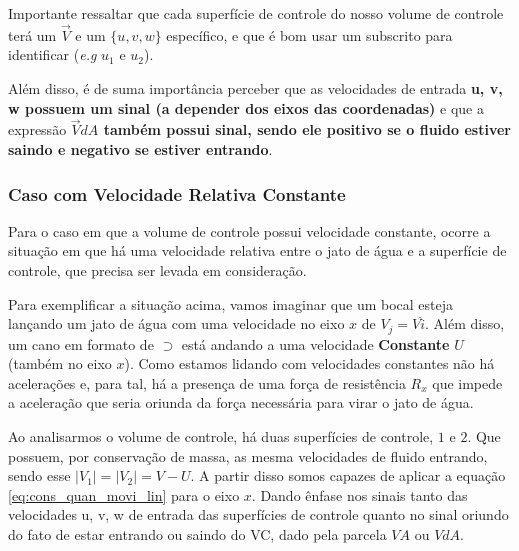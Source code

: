 \documentclass{article}
\begin{document}
            Importante ressaltar que cada superfície de controle do nosso volume de controle terá um $\vec V$ e um $\{u, v, w\}$ específico, e que é bom usar um subscrito para identificar (\emph{e.g} $u_1$ e $u_2$).

            Além disso, é de suma importância perceber que as velocidades de entrada \textbf{{u, v, w} possuem um sinal (a depender dos eixos das coordenadas)} e que a expressão \textbf{$\vec V dA$ também possui sinal, sendo ele positivo se o fluido estiver saindo e negativo se estiver entrando}.

        \subsubsection{Caso com Velocidade Relativa Constante}
            Para o caso em que a volume de controle possui velocidade constante, ocorre a situação em que há uma velocidade relativa entre o jato de água e a superfície de controle, que precisa ser levada em consideração. 
            
            Para exemplificar a situação acima, vamos imaginar que um bocal esteja lançando um jato de água com uma velocidade no eixo $x$ de $V_j = V \hat i$. Além disso, um cano em formato de $\supset$ está andando a uma velocidade \textbf{Constante} $U$ (também no eixo $x$). Como estamos lidando
            com velocidades constantes não há acelerações e, para tal, há a presença de uma força de resistência $R_x$ que impede a aceleração que seria oriunda da força necessária para virar o jato de água.

            Ao analisarmos o volume de controle, há duas superfícies de controle, $1$ e $2$. Que possuem, por conservação de massa, as mesma velocidades de fluido entrando, sendo esse $|V_1| = |V_2| = V - U$. A partir disso somos capazes de aplicar a equação  \ref{eq:cons_quan_movi_lin} para o eixo $x$. Dando ênfase nos sinais tanto das velocidades {u, v, w} de entrada das superfícies de controle quanto no sinal oriundo do fato de estar entrando ou saindo do VC, dado pela parcela $VA$ ou $VdA$.
            


    
\end{document}
